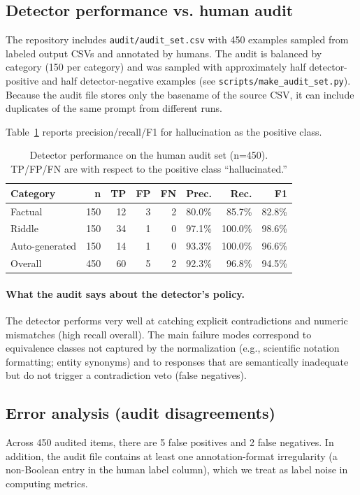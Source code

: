 \documentclass[11pt]{article}
\begin{document}
\subsection{Detector performance vs. human audit}
\label{sec:audit}
The repository includes \texttt{audit/audit\_set.csv} with 450 examples sampled from labeled output CSVs and annotated by humans. The audit is balanced by category (150 per category) and was sampled with approximately half detector-positive and half detector-negative examples (see \texttt{scripts/make\_audit\_set.py}). Because the audit file stores only the basename of the source CSV, it can include duplicates of the same prompt from different runs.

Table~\ref{tab:detector-prf} reports precision/recall/F1 for hallucination as the positive class.

\begin{table}[t]
\centering
\caption{Detector performance on the human audit set (n=450). TP/FP/FN are with respect to the positive class ``hallucinated.''}
\label{tab:detector-prf}
\begin{tabular}{lrrrrrrr}
\toprule
\textbf{Category} & \textbf{n} & \textbf{TP} & \textbf{FP} & \textbf{FN} & \textbf{Prec.} & \textbf{Rec.} & \textbf{F1} \\
\midrule
Factual & 150 & 12 & 3 & 2 & 80.0\% & 85.7\% & 82.8\% \\
Riddle & 150 & 34 & 1 & 0 & 97.1\% & 100.0\% & 98.6\% \\
Auto-generated & 150 & 14 & 1 & 0 & 93.3\% & 100.0\% & 96.6\% \\
\midrule
Overall & 450 & 60 & 5 & 2 & 92.3\% & 96.8\% & 94.5\% \\
\bottomrule
\end{tabular}
\end{table}

\paragraph{What the audit says about the detector's policy.}
The detector performs very well at catching explicit contradictions and numeric mismatches (high recall overall). The main failure modes correspond to equivalence classes not captured by the normalization (e.g., scientific notation formatting; entity synonyms) and to responses that are semantically inadequate but do not trigger a contradiction veto (false negatives).

\subsection{Error analysis (audit disagreements)}
Across 450 audited items, there are 5 false positives and 2 false negatives. In addition, the audit file contains at least one annotation-format irregularity (a non-Boolean entry in the human label column), which we treat as label noise in computing metrics.
\end{document}
